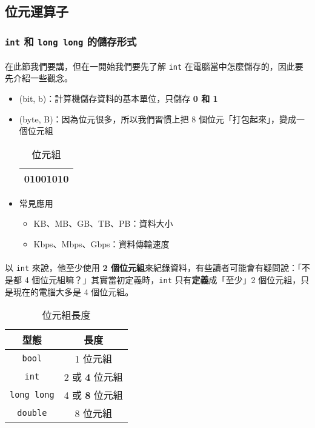 \documentclass[12pt,a4paper,oneside]{article}
\begin{document}
\begin{CJK}{UTF8}{bkai}
\subsection{位元運算子}
\subsubsection{\lstinline!int! 和 \lstinline!long long! 的儲存形式}

\paragraph{}在此節我們要講，但在一開始我們要先了解 \lstinline!int! 在電腦當中怎麼儲存的，因此要先介紹一些觀念。

\begin{itemize}
\item {} (bit, b)：計算機儲存資料的基本單位，只儲存 \textbf{0 和 1}
\item {} (byte, B)：因為位元很多，所以我們習慣上把 8 個位元「打包起來」，變成一個位元組

\begin{table}[h]
\centering
\begin{tabular}{|c|}
\hline
01001010\\
\hline
\end{tabular}
\caption{位元組}
\label{basic:cpp:table:byte}
\end{table}

\item 常見應用
  \begin{itemize}
  \item KB、MB、GB、TB、PB：資料大小
  \item Kbps、Mbps、Gbps：資料傳輸速度
  \end{itemize}
\end{itemize}

\paragraph{}以 \lstinline!int! 來說，他至少使用 \textbf{2 個位元組}來紀錄資料，有些讀者可能會有疑問說：「不是都 4 個位元組嘛？」其實當初定義時，\lstinline!int! 只有\textbf{定義}成「至少」2 個位元組，只是現在的電腦大多是 4 個位元組。

\begin{table}[h!]
\centering
\begin{tabular}{|c|c|}
\hline
型態 & 長度\\
\hline
\hline
\lstinline!bool!      & 1 位元組\\
\hline
\lstinline!int!       & 2 或 \textbf{4} 位元組\\
\hline
\lstinline!long long! & 4 或 \textbf{8} 位元組\\
\hline
\lstinline!double!    & 8 位元組\\
\hline
\end{tabular}
\caption{位元組長度}
\label{basic:cpp:table:byte:length}
\end{table}


\end{CJK}
\end{document}
